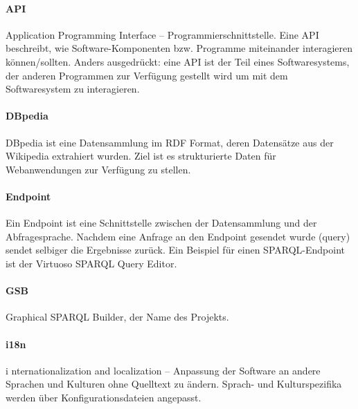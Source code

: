 
\newcommand{\begriff}[2]{
\paragraph{#1}
#2
}


\begriff{API}
{Application Programming Interface -- Programmierschnittstelle.
Eine API be\hack{-\break}schreibt, wie Software-Komponenten bzw. Programme miteinander interagieren können/sollten. Anders ausgedrückt: eine API ist der Teil eines Softwaresystems, der anderen Programmen zur Verfügung gestellt wird um mit dem Softwaresystem zu interagieren.}

\begriff{DBpedia}
{DBpedia ist eine Datensammlung im RDF Format, deren Datensätze aus der Wikipedia extrahiert wurden. Ziel ist es strukturierte Daten für Webanwendungen zur Verfügung zu stellen.
\cite{dbpedia-wikipedia,dbpedia,dbpedia-datasets}
}

\begriff{Endpoint}
{Ein Endpoint ist eine Schnittstelle zwischen der Datensammlung und der 
Abfragesprache. Nachdem eine Anfrage an den Endpoint gesendet wurde (query)  sendet selbiger die Ergebnisse zurück. Ein Beispiel für einen SPARQL-Endpoint ist der \glqq Virtuoso SPARQL Query Editor\grqq . \cite{dbpedia-sparql}}

\begriff{GSB}
{Graphical SPARQL Builder, der Name des Projekts. \cite{swp14-gsb}}

\begriff{i18n} internationalization and localization -- Anpassung der Software an andere Sprachen und Kulturen ohne Quelltext zu ändern. Sprach- und Kulturspezifika werden über Konfigurationsdateien angepasst. 



